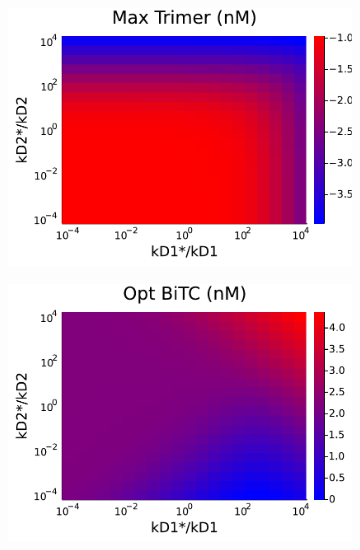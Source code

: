 \begin{figure}
	\centering
	\begin{subfigure}[b]{0.46\textwidth}
		\centering
		\includegraphics[width=1\textwidth]{fig/h1.pdf}
		\caption{}
		\label{fig:h1}
	\end{subfigure}
	\hspace{0.05\textwidth}
	\begin{subfigure}[b]{0.46\textwidth}
		\centering
		\includegraphics[width=1\textwidth]{fig/h2.pdf}
		\caption{}
		\label{fig:h2}
	\end{subfigure}
	\\
	\vspace{0.05\textwidth}
	\begin{subfigure}[b]{0.46\textwidth}

\end{subfigure}
\end{figure}
